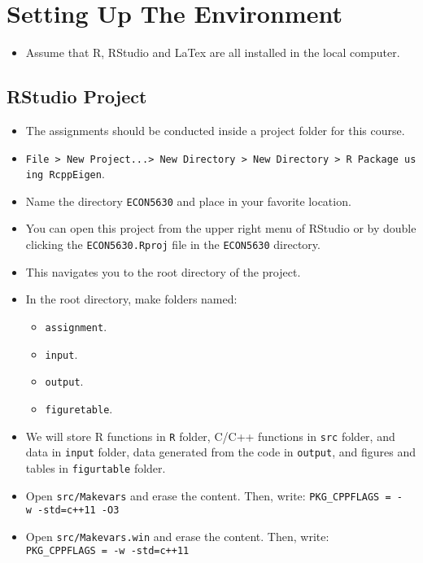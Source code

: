 \documentclass[
]{book}
\providecommand{\tightlist}{%
  \setlength{\itemsep}{0pt}\setlength{\parskip}{0pt}}
\begin{document}
\hypertarget{setting-up-the-environment}{%
\section{Setting Up The Environment}\label{setting-up-the-environment}}

\begin{itemize}
\tightlist
\item
  Assume that R, RStudio and LaTex are all installed in the local computer.
\end{itemize}

\hypertarget{rstudio-project}{%
\subsection{RStudio Project}\label{rstudio-project}}

\begin{itemize}
\tightlist
\item
  The assignments should be conducted inside a project folder for this course.
\item
  \texttt{File\ \textgreater{}\ New\ Project...\textgreater{}\ New\ Directory\ \textgreater{}\ New\ Directory\ \textgreater{}\ R\ Package\ using\ RcppEigen}.
\item
  Name the directory \texttt{ECON5630} and place in your favorite location.
\item
  You can open this project from the upper right menu of RStudio or by double clicking the \texttt{ECON5630.Rproj} file in the \texttt{ECON5630} directory.
\item
  This navigates you to the root directory of the project.
\item
  In the root directory, make folders named:

  \begin{itemize}
  \tightlist
  \item
    \texttt{assignment}.
  \item
    \texttt{input}.
  \item
    \texttt{output}.
  \item
    \texttt{figuretable}.
  \end{itemize}
\item
  We will store R functions in \texttt{R} folder, C/C++ functions in \texttt{src} folder, and data in \texttt{input} folder, data generated from the code in \texttt{output}, and figures and tables in \texttt{figurtable} folder.
\item
  Open \texttt{src/Makevars} and erase the content. Then, write: \texttt{PKG\_CPPFLAGS\ =\ -w\ -std=c++11\ -O3}
\item
  Open \texttt{src/Makevars.win} and erase the content. Then, write: \texttt{PKG\_CPPFLAGS\ =\ -w\ -std=c++11}
\end{itemize}
\end{document}

